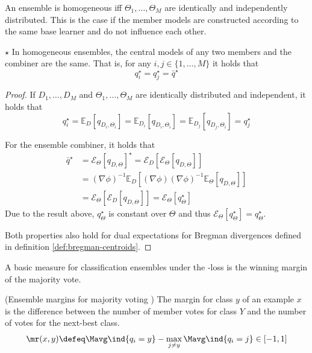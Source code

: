 \documentclass[
    a4paper, %
	fontsize=10pt, %
	twoside=false, %
]{kaobook}
\begin{document}
An ensemble is homogeneous iff $\Theta_{1}, \dots, \Theta_{M}$ are identically and independently distributed. This is the case if the member models are constructed according to the same base learner and do not influence each other. 
\begin{lemma}  $\star$ In homogeneous ensembles, the central models of any two members and the combiner are the same. That is, for any $i, j \in \{ 1, \dots, M \}$ it holds that
$$
q_{i}^\star = q_{j}^\star = \bar{q}^\star
$$
\end{lemma}
\begin{proof}
If $D_{1}, \dots, D_{M}$ and $\Theta_{1}, \dots, \Theta_{M}$ are identically distributed and independent, it holds that
$$
q_{i}^\star = \mathbb{E}_{D}\left[ q_{D_{i}, \Theta_{i}} \right]  = \mathbb{E}_{D_{i}}\left[ q_{D_{i}, \Theta_{i}} \right]  
= \mathbb{E}_{D_{j}}\left[ q_{D_{j}, \Theta_{i}} \right] = q_{j}^\star
$$

For the ensemble combiner, it holds that
\begin{align*}
\bar{q}^\star &= \mathcal{E}_{\Theta}\left[ q_{D,\Theta} \right] ^\star = \mathcal{E}_{D}\left[ \mathcal{E}_{\Theta}\left[ q_{D,\Theta} \right]   \right] \\
&= (\nabla \phi)^{-1} \mathbb{E}_{D}\left[ (\nabla \phi) (\nabla \phi)^{-1} \mathbb{E}_{\Theta}\left[ q_{D,\Theta} \right]   \right] \\
&= \mathcal{E}_{\Theta}\left[ \mathcal{E}_{D}\left[ q_{D, \Theta} \right]  \right] = \mathcal{E}_{\Theta}\left[ q_{\Theta}^\star \right] 
\end{align*}
Due to the result above, $q_{\Theta}^\star$ is constant over $\Theta$ and thus $\mathcal{E}_{\Theta}\left[ q_{\Theta}^\star \right] = q_{\Theta}^\star$.

Both properties also hold for dual expectations for Bregman divergences defined in definition \ref{def:bregman-centroids}.
\end{proof}

A basic measure for classification ensembles under the \zeroone-loss is the winning margin of the majority vote.
\begin{definition} (Ensemble margins for majority voting \cite{breiman})
The margin for class $y$ of an example $x$ is the difference between the number of member votes for class $Y$ and the number of votes for the next-best class.
	$$
\mr(x,y) \defeq \Mavg \ind{q_{i} = y} - \max_{j \neq y} \Mavg \ind{q_{i} = j} \in [-1, 1]
$$
\label{def:ensemble-margin}
\end{definition}
\end{document}
